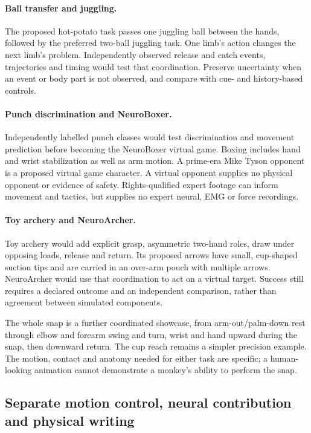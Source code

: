 \paragraph{Ball transfer and juggling.}
The proposed hot-potato task passes one juggling ball between the hands, followed
by the preferred two-ball juggling task. One limb's action changes the next
limb's problem. Independently observed release and catch events, trajectories
and timing would test that coordination. Preserve uncertainty when an event or
body part is not observed, and compare with cue- and history-based controls.

\paragraph{Punch discrimination and NeuroBoxer.}
Independently labelled punch classes would test discrimination and movement
prediction before becoming the NeuroBoxer virtual game. Boxing includes hand
and wrist stabilization as well as arm motion. A prime-era Mike Tyson opponent
is a proposed virtual game character. A virtual opponent supplies no physical
opponent or evidence of safety. Rights-qualified expert footage can inform
movement and tactics, but supplies no expert neural, EMG or force recordings.

\paragraph{Toy archery and NeuroArcher.}
Toy archery would add explicit grasp, asymmetric two-hand roles, draw under
opposing loads, release and return. Its proposed arrows have small, cup-shaped
suction tips and are carried in an over-arm pouch with multiple arrows. NeuroArcher would use that coordination to act
on a virtual target. Success still requires a declared outcome and an
independent comparison, rather than agreement between simulated components.

The whole snap is a further coordinated showcase, from arm-out/palm-down rest
through elbow and forearm swing and turn, wrist and hand upward during the snap,
then downward return. The cup reach remains a simpler precision example. The
motion, contact and anatomy needed for either task are specific; a human-looking
animation cannot demonstrate a monkey's ability to perform the snap.

\subsection{Separate motion control, neural contribution and physical writing}


